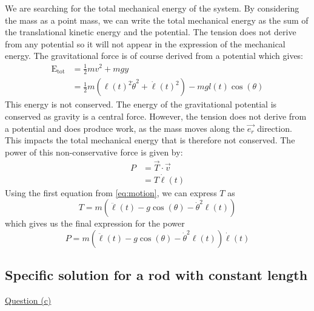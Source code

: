 We are searching for the total mechanical energy of the system. By considering the mass as a point mass, we can write the total mechanical energy as the sum of the translational kinetic energy and the potential. The tension does not derive from any potential so it will not appear in the expression of the mechanical energy. The gravitational force is of course derived from a potential which gives:
\begin{equation}
    \begin{aligned}
        \mathrm{E_{tot}} &= \frac{1}{2}mv^2 + mgy \\
        &= \frac{1}{2}m(\ell(t)^2 \dot\theta^2 + \dot\ell(t)^2) - mgl(t)\cos(\theta)
    \end{aligned}
\end{equation}
This energy is not conserved. The energy of the gravitational potential is conserved as gravity is a central force. However, the tension does not derive from a potential and does produce work, as the mass moves along the \(\vec{e_r}\) direction. This impacts the total mechanical energy that is therefore not conserved. The power of this non-conservative force is given by:
\begin{equation}
    \begin{aligned}
        P &= \vec{T} \cdot \vec{v} \\
        &= T \dot\ell(t)
    \end{aligned}
\end{equation}
Using the first equation from \autoref{eq:motion}, we can express \(T\) as
\begin{equation}
    T = m(\ddot\ell(t) - g\cos(\theta) - \dot\theta^2 \ell(t))
\end{equation}
which gives us the final expression for the power
\begin{equation}
    P = m(\ddot\ell(t) - g\cos(\theta) - \dot\theta^2 \ell(t)) \dot\ell(t)
\end{equation}

\subsection{Specific solution for a rod with constant length}
\label{sec:analytic:constant_length}
\underline{Question (c)}


